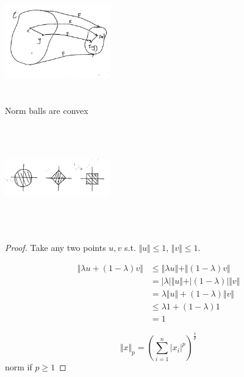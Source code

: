 \begin{marginfigure}
	\centering
	\includegraphics[width=1.8in,height=1.8in]{figures/ch08/figure1023_5.png}
\end{marginfigure}


Norm balls are convex

\begin{marginfigure}
	\centering
	\includegraphics[width=1.8in,height=1.8in]{figures/ch08/figure1023_6.png}
\end{marginfigure}

\begin{proof}
	Take any two points $u,v$ s.t. $\Vert u\Vert \leq 1$, $\Vert v\Vert \leq 1$. 
	
	\begin{align*}
	\Vert \lambda u+(1-\lambda)v\Vert &\leq \Vert \lambda u\Vert + \Vert (1-\lambda)v\Vert\\
	&= \vert \lambda \vert \Vert  u\Vert + \vert (1-\lambda) \vert \Vert  v\Vert\\
	&= \lambda\Vert  u\Vert + (1-\lambda)\Vert  v\Vert\\
	&\leq \lambda 1 + (1-\lambda)1\\
	&= 1
	\end{align*}
	
	\begin{equation*}
	\Vert  x\Vert_p = (\sum^n_{i=1}\vert  x_i\vert^p)^{\frac{1}{p}}
	\end{equation*}
	norm if $p\geq 1$
\end{proof}

